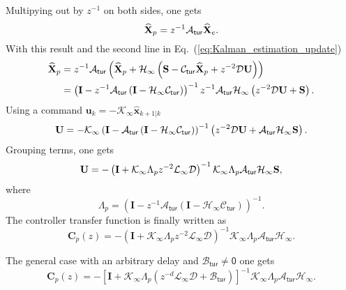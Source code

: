 \documentclass[a4paper,12pt]{article}
\newcommand{\0}{\mathsf{0}} %
\newcommand{\I}{\mathbf{I}} %
\newcommand{\Hkal}{\mathcal{H}_{\infty}} %
\newcommand{\Lkal}{\mathcal{L}_{\infty}} %
\newcommand{\K}{\mathcal{K}_{\infty}} %
\newcommand{\z}{{z}} %
\newcommand{\xz}{\text{\bf X}} %
\newcommand{\uz}{\text{\bf U}} %
\newcommand{\yz}{\text{\bf S}} %
\newcommand{\Ad}{\mathcal{A}_\mathsf{tur}} %
\newcommand{\Bd}{\mathcal{B}_\mathsf{tur}} %
\newcommand{\Cd}{\mathcal{C}_\mathsf{tur}} %
\newcommand{\xvec}{{\mathbf{x}}}
\newcommand{\uvec}{{\mathbf{u}}}
\begin{document}
\begin{demo}
          Multipying out by $z^{-1}$ on both sides, one gets 
          \begin{equation}
            \widehat{\xz}_{p} = \z^{-1} \Ad \widehat{\xz}_{e}.
          \end{equation}
          With this result and the second line in Eq.~(\ref{eq:Kalman_estimation_update})
          \begin{align}
            \widehat{\xz}_{p} & = \z^{-1} \Ad \left(\widehat{\xz}_{p} +
              \Hkal \left( \yz - \Cd \widehat{\xz}_{p}  + \z^{-2}
                \mathcal{D} \uz\right)\right) \nonumber \\
            & = \left(\I -  \z^{-1}\Ad \left( \I - \Hkal \Cd
              \right)\right)^{-1} \z^{-1} \Ad \Hkal \left( \z^{-2} \mathcal{D}  \uz +  \yz\right).
          \end{align}
          Using a command  $\uvec_k = -\K \widehat{\xvec}_{k+1|k}$
          \begin{align}
            \uz = -\K \left(\I - \Ad \left( \I - \Hkal \Cd
              \right)\right)^{-1} \left( \z^{-2} \mathcal{D}  \uz + \Ad \Hkal \yz\right).
          \end{align}
         Grouping terms, one gets
          \begin{equation}
            \uz = - \left( \I + \K \Lambda_{p} \z^{-2} \Lkal \mathcal{D} \right)^{-1} \K
            \Lambda_{p} \Ad \Hkal \yz,
          \end{equation}
  where 
  \begin{equation}
    \Lambda_{p} = \left(\I -  \z^{-1}\Ad \left( \I - \Hkal \Cd
              \right)\right)^{-1} .
  \end{equation}
 The controller transfer function is finally written as
  \begin{equation}
    \label{eq:Kalman_predictor_TFdemo}
    \mathbf{C}_p(\z) =  - \left( \I + \K \Lambda_{p} \z^{-2} \Lkal \mathcal{D} \right)^{-1} \K
            \Lambda_{p} \Ad \Hkal  .
  \end{equation}

The general case with an arbitrary delay and  $\Bd \neq \0$ one gets
  \begin{equation}
    \mathbf{C}_p(\z) =  - \left[ \I + \K \Lambda_{p} \left(\z^{-d} \Lkal
      \mathcal{D} + \Bd \right)\right]^{-1} \K
            \Lambda_{p} \Ad \Hkal  .
  \end{equation}



\end{demo}
\end{document}
